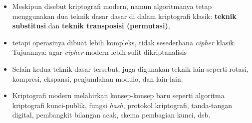 \documentclass{article}
\begin{document}

\begin{itemize}
    \item Meskipun disebut kriptografi modern, namun algoritmanya tetap menggunakan dua teknik dasar dasar di dalam kriptografi klasik: \textbf{teknik substitusi} dan \textbf{teknik transposisi (permutasi)},
    \item tetapi operasinya dibuat lebih kompleks, tidak sesederhana \textit{cipher} klasik. Tujuannya: agar \textit{cipher} modern lebih sulit dikriptanalisis
    \item Selain kedua teknik dasar tersebut, juga digunakan teknik lain seperti rotasi, kompresi, ekspansi, penjumlahan modulo, dan lain-lain.
    \item Kriptografi modern melahirkan konsep-konsep baru seperti algoritma kriptografi kunci-publik, fungsi \textit{hash}, protokol kriptografi, tanda-tangan digital, pembangkit bilangan acak, skema pembagian kunci, dsb.
\end{itemize}
\end{document}
